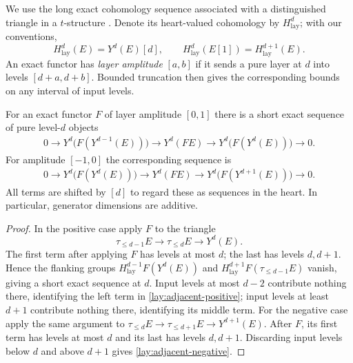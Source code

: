 We use the long exact cohomology sequence associated with a distinguished
triangle in a $t$-structure \cite[Section~1.3, Theorem~1.3.6]{BBD1982}.
Denote its heart-valued cohomology by
$H^d_{\mathrm{lay}}$; with our conventions,
\[
 H^d_{\mathrm{lay}}(E)=Y^d(E)[d],
 \qquad
 H^d_{\mathrm{lay}}(E[1])=H^{d+1}_{\mathrm{lay}}(E).
\]
An exact functor has \emph{layer amplitude} $[a,b]$ if it sends a pure
layer at $d$ into levels $[d+a,d+b]$.  Bounded truncation then gives the
corresponding bounds on any interval of input levels.

\begin{lemma}\label{lay:adjacent}
For an exact functor $F$ of layer amplitude $[0,1]$ there is a short
exact sequence of pure level-$d$ objects
\begin{equation}
\begin{split}
0\longrightarrow Y^d\bigl(F(Y^{d-1}(E))\bigr)
\longrightarrow Y^d(FE)
\longrightarrow Y^d\bigl(F(Y^d(E))\bigr)
\longrightarrow0.
\end{split}\label{lay:adjacent-positive}
\end{equation}
For amplitude $[-1,0]$ the corresponding sequence is
\begin{equation}
\begin{split}
0\longrightarrow Y^d\bigl(F(Y^d(E))\bigr)
\longrightarrow Y^d(FE)
\longrightarrow Y^d\bigl(F(Y^{d+1}(E))\bigr)
\longrightarrow0.
\end{split}\label{lay:adjacent-negative}
\end{equation}
All terms are shifted by $[d]$ to regard these as sequences in the
heart.  In particular, generator dimensions are additive.
\end{lemma}

\begin{proof}
In the positive case apply $F$ to the triangle
\[
 \tau_{\le d-1}E\longrightarrow\tau_{\le d}E
 \longrightarrow Y^d(E).
\]
The first term after applying $F$ has levels at most $d$; the last has
levels $d,d+1$.  Hence the flanking groups
$H^{d-1}_{\mathrm{lay}}F(Y^d(E))$ and
$H^{d+1}_{\mathrm{lay}}F(\tau_{\le d-1}E)$ vanish, giving a short
exact sequence at $d$.  Input levels at most $d-2$ contribute nothing
there, identifying the left term in
\eqref{lay:adjacent-positive}; input levels at least $d+1$ contribute
nothing there, identifying its middle term.  For the negative case
apply the same argument to
$\tau_{\le d}E\to\tau_{\le d+1}E\to Y^{d+1}(E)$.
After $F$, its first term has levels at most $d$ and its last has levels
$d,d+1$.  Discarding input levels below $d$ and above $d+1$ gives
\eqref{lay:adjacent-negative}.
\end{proof}


